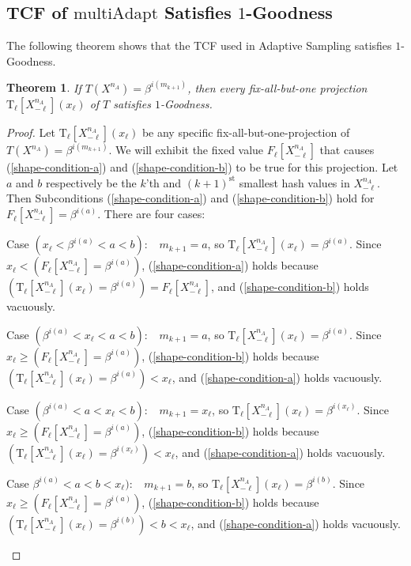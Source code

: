 \documentclass{article}
\newcommand{\xnml}{X^{n_A}_{-\ell}}
\newcommand{\txn}{\mathrm{T_\ell}[X^{n_A}_{-\ell}](x_\ell)}
\newcommand{\xhatfull}{F_\ell[X^{n_A}_{-\ell}]}
\newenvironment{tighterdescription}{\begin{description}\setlength{\itemsep}{1pt}\setlength{\parskip}{1pt}}{\end{description}}
\newtheorem{theorem}{Theorem}[section]
\newcommand{\romIAdapt}{\mathrm{multiAdapt}}
\begin{document}
\subsection{TCF of $\romIAdapt$ Satisfies $1$-Goodness}\label{sec:adapt-sat}
The following theorem shows that the TCF used in Adaptive Sampling satisfies $1$-Goodness.
\begin{theorem}\label{thm:adapt-sat}
If $T(X^{n_A}) = \beta^{i(m_{k+1})}$, 
then every fix-all-but-one projection $\txn$ of $T$ satisfies $1$-Goodness.
\end{theorem}
\begin{proof}
Let $\txn$ be any specific fix-all-but-one-projection of $T(X^{n_A}) = \beta^{i(m_{k+1})}$.
We will exhibit the fixed value $\xhatfull$ that causes (\ref{shape-condition-a}) and (\ref{shape-condition-b})
to be true for this projection.
Let $a$ and $b$ respectively be the $k$'th and $(k\!+\!1)^{\text{st}}$
smallest hash values in $\xnml$. 
Then Subconditions (\ref{shape-condition-a}) and (\ref{shape-condition-b}) hold for
$\xhatfull = \beta^{i(a)}$. There are four cases:

\begin{tighterdescription}
\item[Case $(x_\ell < \beta^{i(a)} < a < b):\;\;$]
$m_{k+1} = a$, so $\txn = \beta^{i(a)}$.
Since $x_\ell < (\xhatfull = \beta^{i(a)})$, (\ref{shape-condition-a}) holds because  $(\txn = \beta^{i(a)}) = \xhatfull$,
and (\ref{shape-condition-b}) holds vacuously.

\item[Case $(\beta^{i(a)} < x_\ell < a < b):\;\;$]
$m_{k+1} = a$, so $\txn = \beta^{i(a)}$.
Since $x_\ell \ge (\xhatfull = \beta^{i(a)})$, (\ref{shape-condition-b}) holds because  $(\txn = \beta^{i(a)}) < x_\ell$, 
and (\ref{shape-condition-a}) holds vacuously.

\item[Case $(\beta^{i(a)} < a < x_\ell < b):\;\;$]
$m_{k+1} = x_\ell$, so $\txn = \beta^{i(x_\ell)}$.
Since $x_\ell \ge (\xhatfull = \beta^{i(a)})$, (\ref{shape-condition-b}) holds because $(\txn = \beta^{i(x_\ell)}) < x_\ell$,
and (\ref{shape-condition-a}) holds vacuously.

\item[Case $\beta^{i(a)} < a < b < x_\ell):\;\;$]
$m_{k+1} = b$, so $\txn = \beta^{i(b)}$.
Since $x_\ell \ge (\xhatfull = \beta^{i(a)})$, (\ref{shape-condition-b}) holds because  $(\txn = \beta^{i(b)}) < b < x_\ell$,
and (\ref{shape-condition-a}) holds vacuously.
\end{tighterdescription}
\end{proof}
\end{document}
